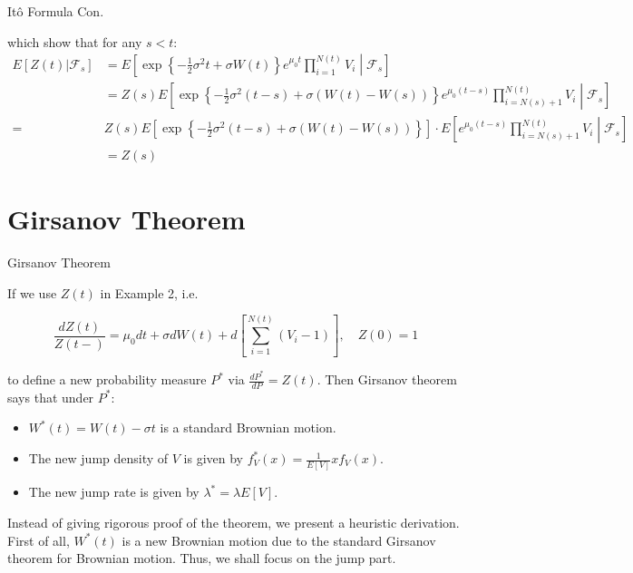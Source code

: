 \documentclass{beamer}
\begin{document}
\begin{frame}{Itô Formula Con.}

    {\footnotesize \footnotesize
    \par which show that for any $s<t$:
    \[
    \begin{aligned}
    E [Z(t) | \mathcal{F}_s] &= E \left[ \exp \left\{ -\frac{1}{2} \sigma^2 t + \sigma W(t) \right\} e^{\mu_0 t} \prod_{i=1}^{N(t)} V_i \middle| \mathcal{F}_s \right] \\
    &= Z(s) E \left[ \exp \left\{ -\frac{1}{2} \sigma^2 (t-s) + \sigma (W(t) - W(s)) \right\} e^{\mu_0 (t-s)} \prod_{i=N(s)+1}^{N(t)} V_i \middle| \mathcal{F}_s \right] \\
    = &Z(s) E \left[ \exp \left\{ -\frac{1}{2} \sigma^2 (t-s) + \sigma (W(t) - W(s)) \right\}\right]\cdot
    E \left[ e^{\mu_0 (t-s)} \prod_{i=N(s)+1}^{N(t)} V_i \middle| \mathcal{F}_s \right] \\
    &= Z(s)
    \end{aligned}
    \]

    }
    
\end{frame}

\section{Girsanov Theorem}
\begin{frame}{Girsanov Theorem}

    {\footnotesize \footnotesize
    \par If we use \( Z(t) \) in Example 2, i.e.

\[
\frac{dZ(t)}{Z(t-)} = \mu_0 dt + \sigma dW(t) + d \left[ \sum_{i=1}^{N(t)} (V_i - 1) \right], \quad Z(0) = 1
\]

to define a new probability measure \( P^* \) via $\frac{dP^*}{dP} = Z(t).$ 
Then Girsanov theorem says that under \( P^* \):
\begin{itemize}
    \item $W^*(t) = W(t) - \sigma t$ is a standard Brownian motion.
    \item The new jump density of \( V \) is given by $f_V^*(x) = \frac{1}{E[V]} x f_V(x)$.
    \item The new jump rate is given by $\lambda^* = \lambda E[V]$.
\end{itemize}
\vspace{1em}
\par Instead of giving rigorous proof of the theorem, we present a heuristic derivation. 
First of all, \( W^*(t) \) is a new Brownian motion due to the standard Girsanov theorem for Brownian motion. Thus, we shall focus on the jump part.
    }
    
\end{frame}
\end{document}
